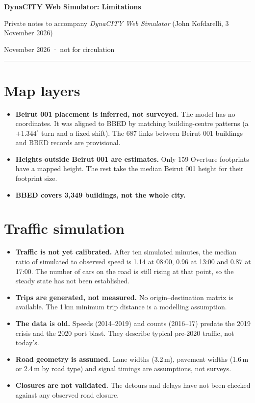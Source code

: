 \documentclass[10pt,a4paper]{article}
\begin{document}
{\color{ink}\Large\bfseries DynaCITY Web Simulator: Limitations}\par\vspace{2pt}
{\color{accent}Private notes to accompany \emph{DynaCITY Web Simulator} (John Kofdarelli, 3 November 2026)}\par\vspace{2pt}
{\small November 2026 · not for circulation}\par
\vspace{4pt}\textcolor{accent}{\rule{\linewidth}{0.6pt}}

\section{Map layers}
\begin{itemize}
\item \textbf{Beirut 001 placement is inferred, not surveyed.} The model has no coordinates. It was aligned to BBED by matching building-centre patterns (a $+1.344^\circ$ turn and a fixed shift). The 687 links between Beirut 001 buildings and BBED records are provisional.
\item \textbf{Heights outside Beirut 001 are estimates.} Only 159 Overture footprints have a mapped height. The rest take the median Beirut 001 height for their footprint size.
\item \textbf{BBED covers 3,349 buildings, not the whole city.}
\end{itemize}

\section{Traffic simulation}
\begin{itemize}
\item \textbf{Traffic is not yet calibrated.} After ten simulated minutes, the median ratio of simulated to observed speed is 1.14 at 08:00, 0.96 at 13:00 and 0.87 at 17:00. The number of cars on the road is still rising at that point, so the steady state has not been established.
\item \textbf{Trips are generated, not measured.} No origin--destination matrix is available. The 1\,km minimum trip distance is a modelling assumption.
\item \textbf{The data is old.} Speeds (2014--2019) and counts (2016--17) predate the 2019 crisis and the 2020 port blast. They describe typical pre-2020 traffic, not today's.
\item \textbf{Road geometry is assumed.} Lane widths (3.2\,m), pavement widths (1.6\,m or 2.4\,m by road type) and signal timings are assumptions, not surveys.
\item \textbf{Closures are not validated.} The detours and delays have not been checked against any observed road closure.
\end{itemize}
\end{document}
